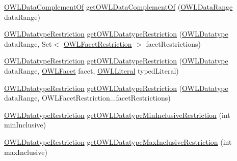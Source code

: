 \begin{DoxyCompactItemize}
\hyperlink{interfaceorg_1_1semanticweb_1_1owlapi_1_1model_1_1_o_w_l_data_complement_of}{O\-W\-L\-Data\-Complement\-Of} \hyperlink{interfaceorg_1_1semanticweb_1_1owlapi_1_1model_1_1_o_w_l_data_factory_ab466012a59017ea167955ffb1e53bdc7}{get\-O\-W\-L\-Data\-Complement\-Of} (\hyperlink{interfaceorg_1_1semanticweb_1_1owlapi_1_1model_1_1_o_w_l_data_range}{O\-W\-L\-Data\-Range} data\-Range)
\item 
\hyperlink{interfaceorg_1_1semanticweb_1_1owlapi_1_1model_1_1_o_w_l_datatype_restriction}{O\-W\-L\-Datatype\-Restriction} \hyperlink{interfaceorg_1_1semanticweb_1_1owlapi_1_1model_1_1_o_w_l_data_factory_a74905083365f7ed4fe08084bf5c2a123}{get\-O\-W\-L\-Datatype\-Restriction} (\hyperlink{interfaceorg_1_1semanticweb_1_1owlapi_1_1model_1_1_o_w_l_datatype}{O\-W\-L\-Datatype} data\-Range, Set$<$ \hyperlink{interfaceorg_1_1semanticweb_1_1owlapi_1_1model_1_1_o_w_l_facet_restriction}{O\-W\-L\-Facet\-Restriction} $>$ facet\-Restrictions)
\item 
\hyperlink{interfaceorg_1_1semanticweb_1_1owlapi_1_1model_1_1_o_w_l_datatype_restriction}{O\-W\-L\-Datatype\-Restriction} \hyperlink{interfaceorg_1_1semanticweb_1_1owlapi_1_1model_1_1_o_w_l_data_factory_a20dc52e6eaa8d380c4803d111634b190}{get\-O\-W\-L\-Datatype\-Restriction} (\hyperlink{interfaceorg_1_1semanticweb_1_1owlapi_1_1model_1_1_o_w_l_datatype}{O\-W\-L\-Datatype} data\-Range, \hyperlink{enumorg_1_1semanticweb_1_1owlapi_1_1vocab_1_1_o_w_l_facet}{O\-W\-L\-Facet} facet, \hyperlink{interfaceorg_1_1semanticweb_1_1owlapi_1_1model_1_1_o_w_l_literal}{O\-W\-L\-Literal} typed\-Literal)
\item 
\hyperlink{interfaceorg_1_1semanticweb_1_1owlapi_1_1model_1_1_o_w_l_datatype_restriction}{O\-W\-L\-Datatype\-Restriction} \hyperlink{interfaceorg_1_1semanticweb_1_1owlapi_1_1model_1_1_o_w_l_data_factory_ad8582046664d10618d0982dbd0ed4c3b}{get\-O\-W\-L\-Datatype\-Restriction} (\hyperlink{interfaceorg_1_1semanticweb_1_1owlapi_1_1model_1_1_o_w_l_datatype}{O\-W\-L\-Datatype} data\-Range, O\-W\-L\-Facet\-Restriction...\-facet\-Restrictions)
\item 
\hyperlink{interfaceorg_1_1semanticweb_1_1owlapi_1_1model_1_1_o_w_l_datatype_restriction}{O\-W\-L\-Datatype\-Restriction} \hyperlink{interfaceorg_1_1semanticweb_1_1owlapi_1_1model_1_1_o_w_l_data_factory_a1034509fef9aa7f15a47be74bdee7ff4}{get\-O\-W\-L\-Datatype\-Min\-Inclusive\-Restriction} (int min\-Inclusive)
\item 
\hyperlink{interfaceorg_1_1semanticweb_1_1owlapi_1_1model_1_1_o_w_l_datatype_restriction}{O\-W\-L\-Datatype\-Restriction} \hyperlink{interfaceorg_1_1semanticweb_1_1owlapi_1_1model_1_1_o_w_l_data_factory_a01dd382462d34c365e6670cda9d05d58}{get\-O\-W\-L\-Datatype\-Max\-Inclusive\-Restriction} (int max\-Inclusive)

\end{DoxyCompactItemize}
